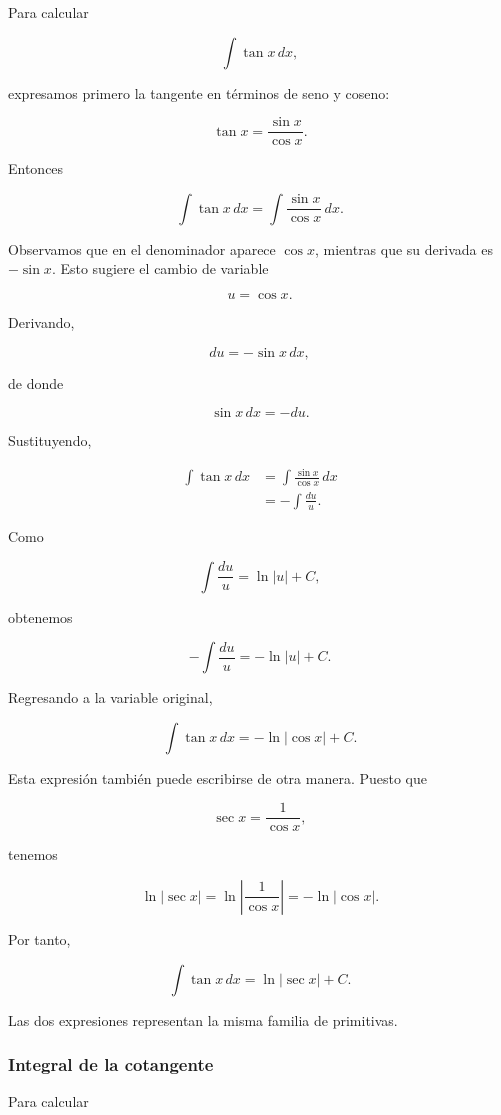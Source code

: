 \documentclass[12pt]{article}
\theoremstyle{definition}
\theoremstyle{remark}
\begin{document}
Para calcular

\[
\int\tan x\,dx,
\]

expresamos primero la tangente en términos de seno y coseno:

\[
\tan x=\frac{\sin x}{\cos x}.
\]

Entonces

\[
\int\tan x\,dx
=
\int\frac{\sin x}{\cos x}\,dx.
\]

Observamos que en el denominador aparece \(\cos x\), mientras que
su derivada es \(-\sin x\). Esto sugiere el cambio de variable

\[
u=\cos x.
\]

Derivando,

\[
du=-\sin x\,dx,
\]

de donde

\[
\sin x\,dx=-du.
\]

Sustituyendo,

\begin{align*}
\int\tan x\,dx
&=
\int\frac{\sin x}{\cos x}\,dx\\[1mm]
&=
-\int\frac{du}{u}.
\end{align*}

Como

\[
\int\frac{du}{u}
=
\ln|u|+C,
\]

obtenemos

\[
-\int\frac{du}{u}
=
-\ln|u|+C.
\]

Regresando a la variable original,

\[
\boxed{
\int\tan x\,dx
=
-\ln|\cos x|+C.
}
\]

Esta expresión también puede escribirse de otra manera. Puesto que

\[
\sec x=\frac{1}{\cos x},
\]

tenemos

\[
\ln|\sec x|
=
\ln\left|\frac{1}{\cos x}\right|
=
-\ln|\cos x|.
\]

Por tanto,

\[
\boxed{
\int\tan x\,dx
=
\ln|\sec x|+C.
}
\]

Las dos expresiones representan la misma familia de primitivas.

\subsubsection*{Integral de la cotangente}

Para calcular
\end{document}
